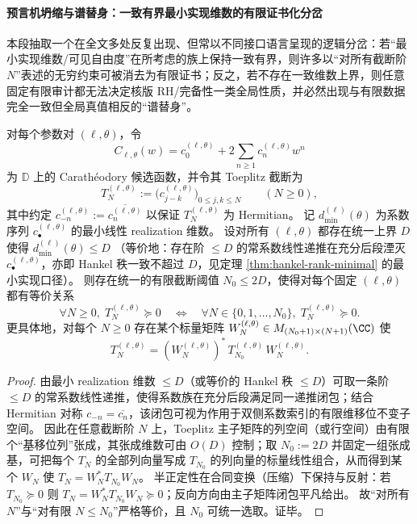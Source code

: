 \paragraph{预言机坍缩与谱替身：一致有界最小实现维数的有限证书化分岔}
本段抽取一个在全文多处反复出现、但常以不同接口语言呈现的逻辑分岔：若“最小实现维数/可见自由度”在所考虑的族上保持一致有界，则许多以“对所有截断阶 \(N\)”表述的无穷约束可被消去为有限证书；反之，若不存在一致维数上界，则任意固定有限审计都无法决定核版 RH/完备性一类全局性质，并必然出现与有限数据完全一致但全局真值相反的“谱替身”。

\begin{theorem}[预言机坍缩：一致有界最小实现维数 \texorpdfstring{$\Longrightarrow$}{=>} Toeplitz--PSD 的有限截断化]\label{thm:xi-oracle-collapse-toeplitz-psd-finite-truncation}
对每个参数对 \((\ell,\theta)\)，令
\[
C_{\ell,\theta}(w)=c^{(\ell,\theta)}_0+2\sum_{n\ge 1}c^{(\ell,\theta)}_n w^n
\]
为 \(\mathbb D\) 上的 Carath\'eodory 候选函数，并令其 Toeplitz 截断为
\[
T^{(\ell,\theta)}_N:=\bigl(c^{(\ell,\theta)}_{j-k}\bigr)_{0\le j,k\le N}\qquad(N\ge 0),
\]
其中约定 \(c^{(\ell,\theta)}_{-n}:=\overline{c^{(\ell,\theta)}_n}\) 以保证 \(T^{(\ell,\theta)}_N\) 为 Hermitian。
记 \(d_{\min}^{(\ell)}(\theta)\) 为系数序列 \(c^{(\ell,\theta)}_\bullet\) 的最小线性 realization 维数。
设对所有 \((\ell,\theta)\) 都存在统一上界 \(D\) 使得 \(d_{\min}^{(\ell)}(\theta)\le D\)
（等价地：存在阶 \(\le D\) 的常系数线性递推在充分后段湮灭 \(c^{(\ell,\theta)}_\bullet\)，亦即 Hankel 秩一致不超过 \(D\)，见定理 \ref{thm:hankel-rank-minimal} 的最小实现口径）。
则存在统一的有限截断阈值 \(N_0\le 2D\)，使得对每个固定 \((\ell,\theta)\) 都有等价关系
\[
\forall N\ge 0,\;T^{(\ell,\theta)}_N\succeq 0
\quad\Longleftrightarrow\quad
\forall N\in\{0,1,\dots,N_0\},\;T^{(\ell,\theta)}_N\succeq 0.
\]
更具体地，对每个 \(N\ge 0\) 存在某个标量矩阵 \(W^{(\ell,\theta)}_N\in M_{(N_0+1)\times (N+1)}(\CC)\) 使
\[
T^{(\ell,\theta)}_N=(W^{(\ell,\theta)}_N)^\ast\,T^{(\ell,\theta)}_{N_0}\,W^{(\ell,\theta)}_N.
\]
\end{theorem}

\begin{proof}
由最小 realization 维数 \(\le D\)（或等价的 Hankel 秩 \(\le D\)）可取一条阶 \(\le D\) 的常系数线性递推，使得系数族在充分后段满足同一递推闭包；结合 Hermitian 对称 \(c_{-n}=\overline{c_n}\)，该闭包可视为作用于双侧系数索引的有限维移位不变子空间。
因此在任意截断阶 \(N\) 上，Toeplitz 主子矩阵的列空间（或行空间）由有限个“基移位列”张成，其张成维数可由 \(O(D)\) 控制；取 \(N_0:=2D\) 并固定一组张成基，可把每个 \(T_N\) 的全部列向量写成 \(T_{N_0}\) 的列向量的标量线性组合，从而得到某个 \(W_N\) 使 \(T_N=W_N^\ast T_{N_0}W_N\)。
半正定性在合同变换（压缩）下保持与反射：若 \(T_{N_0}\succeq 0\) 则 \(T_N=W_N^\ast T_{N_0}W_N\succeq 0\)；反向方向由主子矩阵闭包平凡给出。
故“对所有 \(N\)”与“对有限 \(N\le N_0\)”严格等价，且 \(N_0\) 可统一选取。证毕。
\end{proof}

